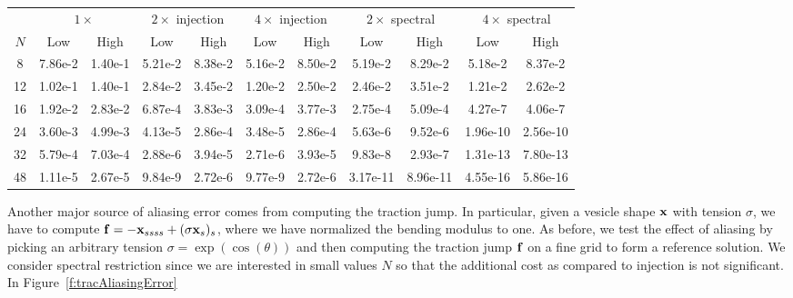 \begin{table}[htpb]
\begin{tabular}{c|cc|cc|cc|cc|cc|}
 & \multicolumn{2}{c|}{$1 \times$} 
 & \multicolumn{2}{c|}{$2 \times$ \: injection}
 & \multicolumn{2}{c|}{$4 \times$ \: injection}
 & \multicolumn{2}{c|}{$2 \times$ \: spectral}
 & \multicolumn{2}{c|}{$4 \times$ \: spectral} \\
 $N$ & Low & High & Low & High & Low & High & Low & High & Low & High \\
 \hline
 8  & 7.86e-2 & 1.40e-1
    & 5.21e-2 & 8.38e-2
    & 5.16e-2 & 8.50e-2
    & 5.19e-2 & 8.29e-2
    & 5.18e-2 & 8.37e-2
    \\
 12 & 1.02e-1 & 1.40e-1
    & 2.84e-2 & 3.45e-2
    & 1.20e-2 & 2.50e-2
    & 2.46e-2 & 3.51e-2
    & 1.21e-2 & 2.62e-2
    \\
 16 & 1.92e-2 & 2.83e-2
    & 6.87e-4 & 3.83e-3
    & 3.09e-4 & 3.77e-3
    & 2.75e-4 & 5.09e-4
    & 4.27e-7 & 4.06e-7
    \\
 24 & 3.60e-3 & 4.99e-3
    & 4.13e-5 & 2.86e-4
    & 3.48e-5 & 2.86e-4
    & 5.63e-6 & 9.52e-6
    & 1.96e-10 & 2.56e-10
    \\
 32 & 5.79e-4 & 7.03e-4
    & 2.88e-6 & 3.94e-5
    & 2.71e-6 & 3.93e-5
    & 9.83e-8 & 2.93e-7
    & 1.31e-13 & 7.80e-13
    \\
 48 & 1.11e-5 & 2.67e-5
    & 9.84e-9 & 2.72e-6
    & 9.77e-9 & 2.72e-6
    & 3.17e-11 & 8.96e-11
    & 4.55e-16 & 5.86e-16
\end{tabular}
\end{table}

Another major source of aliasing error comes from computing the traction
jump.  In particular, given a vesicle shape ${\mathbf{x}}$ with tension $\sigma$,
we have to compute ${\mathbf{f}} = -{\mathbf{x}}_{ssss} + (\sigma {\mathbf{x}}_{s})_{s}$, where we
have normalized the bending modulus to one.  As before, we test the
effect of aliasing by picking an arbitrary tension $\sigma =
\exp(\cos(\theta))$ and then computing the traction jump ${\mathbf{f}}$ on a fine
grid to form a reference solution.  We consider spectral restriction
since we are interested in small values $N$ so that the additional cost
as compared to injection is not significant.  In
Figure~\ref{f:tracAliasingError}



